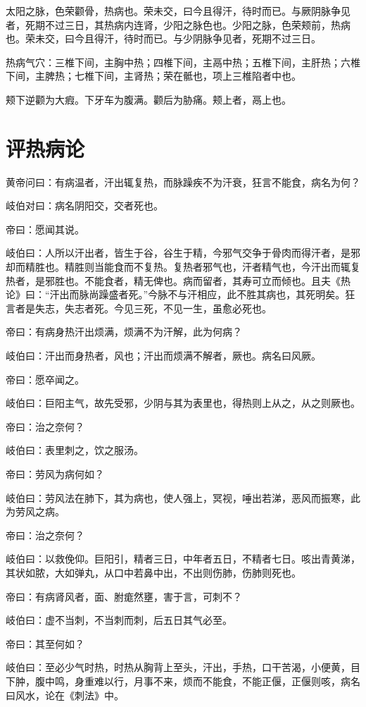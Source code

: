 \documentclass{article}%
\begin{document}
太阳之脉，色荣颧骨，热病也。荣未交，曰今且得汗，待时而已。与厥阴脉争见者，死期不过三日，其热病内连肾，少阳之脉色也。少阳之脉，色荣颊前，热病也。荣未交，曰今且得汗，待时而已。与少阴脉争见者，死期不过三日。

热病气穴：三椎下间，主胸中热；四椎下间，主鬲中热；五椎下间，主肝热；六椎下间，主脾热；七椎下间，主肾热；荣在骶也，项上三椎陷者中也。

颊下逆颧为大瘕。下牙车为腹满。颧后为胁痛。颊上者，鬲上也。
\section{评热病论}
黄帝问曰：有病温者，汗出辄复热，而脉躁疾不为汗衰，狂言不能食，病名为何？

岐伯对曰：病名阴阳交，交者死也。

帝曰：愿闻其说。

岐伯曰：人所以汗出者，皆生于谷，谷生于精，今邪气交争于骨肉而得汗者，是邪却而精胜也。精胜则当能食而不复热。复热者邪气也，汗者精气也，今汗出而辄复热者，是邪胜也。不能食者，精无俾也。病而留者，其寿可立而倾也。且夫《热论》曰：“汗出而脉尚躁盛者死。”今脉不与汗相应，此不胜其病也，其死明矣。狂言者是失志，失志者死。今见三死，不见一生，虽愈必死也。

帝曰：有病身热汗出烦满，烦满不为汗解，此为何病？

岐伯曰：汗出而身热者，风也；汗出而烦满不解者，厥也。病名曰风厥。

帝曰：愿卒闻之。

岐伯曰：巨阳主气，故先受邪，少阴与其为表里也，得热则上从之，从之则厥也。

帝曰：治之奈何？

岐伯曰：表里刺之，饮之服汤。

帝曰：劳风为病何如？

岐伯曰：劳风法在肺下，其为病也，使人强上，冥视，唾出若涕，恶风而振寒，此为劳风之病。

帝曰：治之奈何？

岐伯曰：以救俛仰。巨阳引，精者三日，中年者五日，不精者七日。咳出青黄涕，其状如脓，大如弹丸，从口中若鼻中出，不出则伤肺，伤肺则死也。

帝曰：有病肾风者，面、胕痝然壅，害于言，可刺不？

岐伯曰：虚不当刺，不当刺而刺，后五日其气必至。

帝曰：其至何如？

岐伯曰：至必少气时热，时热从胸背上至头，汗出，手热，口干苦渴，小便黄，目下肿，腹中鸣，身重难以行，月事不来，烦而不能食，不能正偃，正偃则咳，病名曰风水，论在《刺法》中。
\end{document}
